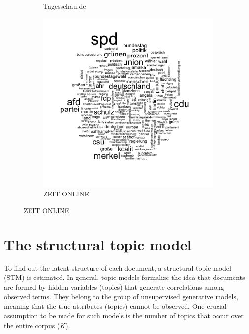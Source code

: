 \documentclass[12pt,a4paper,notitlepage]{article}
\begin{document}
\begin{figure}[H]
\begin{center}
\begin{subfigure}[normla]{0.3\textwidth}
			\caption{Tagesschau.de}
		\end{subfigure}
		\begin{subfigure}[normla]{0.3\textwidth}
			\includegraphics[width=\textwidth]{../figs/wordcloud_ZEITONLINE.png}
			\caption{ZEIT ONLINE}
		\end{subfigure}
	\end{center}
\end{figure}
 
\section{The structural topic model}\label{ch_model}

To find out the latent structure of each document, a structural topic model (STM) is estimated. In general, topic models formalize the idea that documents are formed by hidden variables (topics) that generate correlations among observed terms. They belong to the group of unsupervised generative models, meaning that the true attributes (topics) cannot be observed. One crucial assumption to be made for such models is the number of topics that occur over the entire corpus ($K$). 
\end{document}
